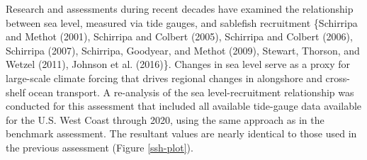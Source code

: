 \documentclass[11pt,
  english,
  a4paper,
]{article}
\begin{document}
Research and assessments during recent decades have examined the relationship between sea level, measured via tide gauges, and sablefish recruitment \{{Schirripa and Methot (2001)\leavevmode\tagmcend\tagstructend}, {Schirripa and Colbert (2005)\leavevmode\tagmcend\tagstructend}, {Schirripa and Colbert (2006)\leavevmode\tagmcend\tagstructend}, {Schirripa (2007)\leavevmode\tagmcend\tagstructend}, {Schirripa, Goodyear, and Methot (2009)\leavevmode\tagmcend\tagstructend}, {Stewart, Thorson, and Wetzel (2011)\leavevmode\tagmcend\tagstructend}, {Johnson et al. (2016)\leavevmode\tagmcend\tagstructend}\}. Changes in sea level serve as a proxy for large-scale climate forcing that drives regional changes in alongshore and cross-shelf ocean transport. A re-analysis of the sea level-recruitment relationship was conducted for this assessment that included all available tide-gauge data available for the U.S. West Coast through 2020, using the same approach as in the benchmark assessment. The resultant values are nearly identical to those used in the previous assessment (Figure \ref{ssh-plot}).

\leavevmode\tagmcend\tagstructend\par
\end{document}
